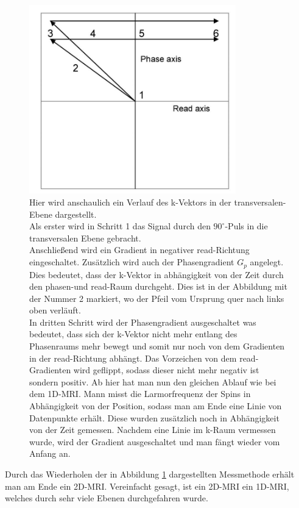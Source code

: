 \begin{figure}[H]
    \centering
    \includegraphics[width = 0.8\textwidth]{Abbildungen/2DMRI.JPG}
    \caption{Hier wird anschaulich ein Verlauf des k-Vektors in der transversalen-Ebene dargestellt.\\
    Als erster wird in Schritt 1 das Signal durch den $90^{\circ}$-Puls in die transversalen Ebene gebracht.\\
    Anschließend wird ein Gradient in negativer read-Richtung eingeschaltet. Zusätzlich wird auch der Phasengradient $G_p$ angelegt. Dies bedeutet, dass der k-Vektor in abhängigkeit von der Zeit durch den phasen-und read-Raum durchgeht. Dies ist in der Abbildung mit der Nummer 2 markiert, wo der Pfeil vom Ursprung quer nach links oben verläuft.\\
    In dritten Schritt wird der Phasengradient ausgeschaltet was bedeutet, dass sich der k-Vektor nicht mehr entlang des Phasenraums mehr bewegt und somit nur noch von dem Gradienten in der read-Richtung abhängt. Das Vorzeichen von dem read-Gradienten wird geflippt, sodass dieser nicht mehr negativ ist sondern positiv. Ab hier hat man nun den gleichen Ablauf wie bei dem 1D-MRI. Mann misst die Larmorfrequenz der Spins in Abhängigkeit von der Position, sodass man am Ende eine Linie von Datenpunkte erhält. Diese wurden  zusätzlich noch in Abhängigkeit von der Zeit gemessen. Nachdem eine Linie im k-Raum vermessen wurde, wird der Gradient ausgeschaltet und man fängt wieder vom Anfang an.\\ \cite{Schmidt}}
    \label{fig:2DMRIk}
\end{figure}
Durch das Wiederholen der in Abbildung \ref{fig:2DMRIk} dargestellten Messmethode erhält man am Ende ein 2D-MRI. Vereinfacht gesagt, ist ein 2D-MRI ein 1D-MRI, welches durch sehr viele Ebenen durchgefahren wurde.


